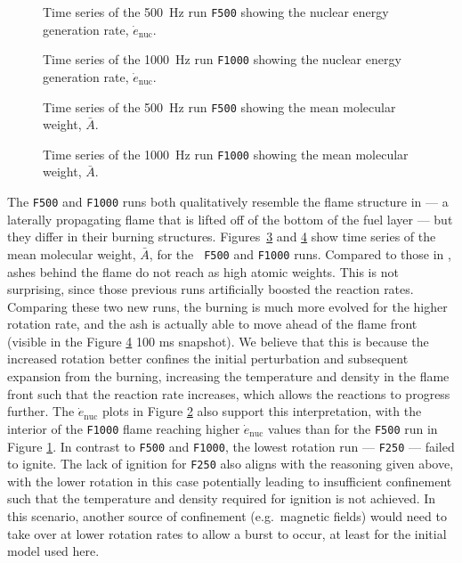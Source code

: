 \documentclass[preprint,times,tighten]{aastex63}
\begin{document}
\begin{figure}[t]
\centering
{}
\caption{\label{fig:time_series_enuc_500} Time series of the 500~Hz run {\tt F500} showing the nuclear energy generation rate, $\dot{e}_\mathrm{nuc}$.}
\end{figure}


\begin{figure}[t]
\centering
{}
\caption{\label{fig:time_series_enuc_1000} Time series of the 1000~Hz run {\tt F1000} showing the nuclear energy generation rate, $\dot{e}_\mathrm{nuc}$.}
\end{figure}

\begin{figure}[t]
\centering
{}
\caption{\label{fig:time_series_500} Time series of the 500~Hz run {\tt F500} showing the mean molecular weight, $\bar{A}$.}
\end{figure}


\begin{figure}[t]
\centering
{}
\caption{\label{fig:time_series_1000} Time series of the 1000~Hz run {\tt F1000} showing the mean molecular weight, $\bar{A}$.}
\end{figure}

The {\tt F500} and {\tt F1000} runs both qualitatively resemble the flame structure in 
\citet{flame_wave1} --- a laterally propagating flame that is lifted off of the bottom of the fuel 
layer --- but they differ in their burning structures. Figures~\ref{fig:time_series_500} and 
\ref{fig:time_series_1000} show time series of the mean molecular weight, $\bar{A}$, for the {\tt 
F500} and {\tt F1000} runs.  Compared to those in \cite{flame_wave1}, ashes behind the flame do not 
reach as high atomic weights. This is not surprising, since those previous runs artificially 
boosted the reaction rates.  Comparing these two new runs, the burning is much more evolved for the 
higher rotation rate, and the ash is actually able to move ahead of the flame front (visible in the 
Figure  \ref{fig:time_series_1000} 100 ms snapshot). We believe that this is because the increased 
rotation better confines the initial perturbation and subsequent expansion from the burning, 
increasing the temperature and density in the flame front such that the reaction rate increases, 
which allows the reactions to progress further. {\color{blue} The $\dot{e}_\mathrm{nuc}$ plots in Figure \ref{fig:time_series_enuc_1000} also support this interpretation, with the interior of the {\tt F1000} flame reaching higher $\dot{e}_\mathrm{nuc}$ values than for the {\tt F500} run in Figure \ref{fig:time_series_enuc_500}.} In contrast to {\tt F500} and {\tt F1000}, the 
lowest rotation run --- {\tt F250} --- failed to ignite. The lack of ignition for {\tt F250} also 
aligns with the reasoning given above, with the lower rotation in this case potentially leading to 
insufficient confinement such that the temperature and density required for ignition is not 
achieved. In this scenario, another source of confinement (e.g.\ magnetic fields) would need to 
take over at lower rotation rates to allow a burst to occur, at least for the initial model used 
here. 
\end{document}
